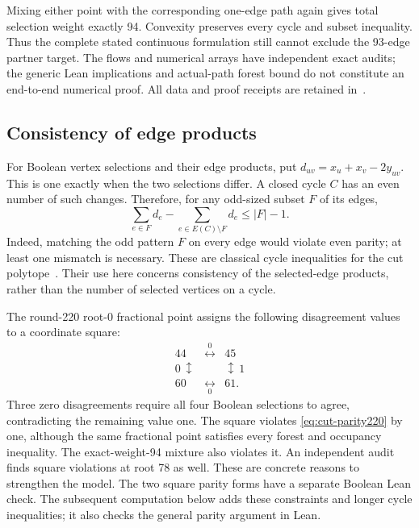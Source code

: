 \documentclass[11pt,a4paper]{article}
\theoremstyle{definition}
\theoremstyle{remark}
\begin{document}
Mixing either point with the corresponding one-edge path again gives
total selection weight exactly 94. Convexity preserves every cycle and
subset inequality. Thus the complete stated continuous formulation
still cannot exclude the 93-edge partner target. The flows and numerical
arrays have independent exact audits; the generic Lean implications and
actual-path forest bound do not constitute an end-to-end numerical proof.
All data and proof receipts are retained in~\cite{research220}.

\subsection{Consistency of edge products}
\label{sec:product220}
For Boolean vertex selections and their edge products, put
$d_{uv}=x_u+x_v-2y_{uv}$. This is one exactly when the two selections
differ. A closed cycle $C$ has an even number of such changes. Therefore,
for any odd-sized subset $F$ of its edges,
\begin{equation}\label{eq:cut-parity220}
\sum_{e\in F}d_e-\sum_{e\in E(C)\setminus F}d_e\le |F|-1.
\end{equation}
Indeed, matching the odd pattern $F$ on every edge would violate even
parity; at least one mismatch is necessary. These are classical cycle
inequalities for the cut polytope~\cite{barahona1986}. Their use here
concerns consistency of the selected-edge products, rather than the
number of selected vertices on a cycle.

The round-220 root-0 fractional point assigns the following disagreement values
to a coordinate square:
\[
\begin{array}{ccc}
44&\overset{0}{\longleftrightarrow}&45\\
0\,\updownarrow&&\updownarrow\,1\\
60&\underset{0}{\longleftrightarrow}&61.
\end{array}
\]
Three zero disagreements require all four Boolean selections to agree,
contradicting the remaining value one. The square violates
\eqref{eq:cut-parity220} by one, although the same fractional point
satisfies every forest and occupancy inequality. The exact-weight-94
mixture also violates it. An independent audit finds square violations
at root 78 as well. These are concrete reasons to strengthen the model.
The two square parity forms have a separate Boolean Lean check.
The subsequent computation below adds these constraints and longer
cycle inequalities; it also checks the general parity argument in Lean.
\end{document}
